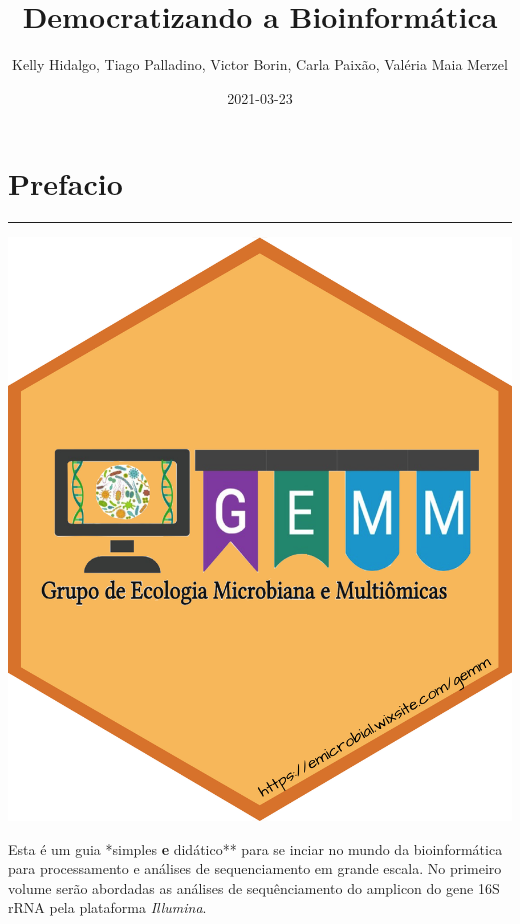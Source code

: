 \documentclass[
]{book}
\title{ Democratizando a Bioinformática}
\author{Kelly Hidalgo, Tiago Palladino, Victor Borin, Carla Paixão, Valéria Maia Merzel}
\date{2021-03-23}
\begin{document}
\maketitle

{
\setcounter{tocdepth}{1}
\tableofcontents
}
\hypertarget{prefacio}{%
\chapter*{Prefacio}\label{prefacio}}

\begin{center}\rule{0.5\linewidth}{0.5pt}\end{center}

\begin{center}\includegraphics[width=1.2\linewidth,height=1.2\textheight]{imgs/1} \end{center}

Esta é um guia *simples\textbf{ e }didático** para se inciar no mundo da bioinformática para processamento e análises de sequenciamento em grande escala. No primeiro volume serão abordadas as análises de sequênciamento do amplicon do gene 16S rRNA pela plataforma \emph{Illumina}.
\end{document}
